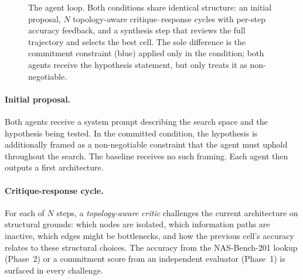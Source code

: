 \begin{figure}[ht]
\begin{center}
{}
\end{center}
\caption{The \haas{} agent loop. Both conditions share identical structure:
         an initial proposal, $N$ topology-aware critique--response cycles with
         per-step accuracy feedback, and a synthesis step that reviews the full
         trajectory and selects the best cell. The sole difference is the
         commitment constraint (blue) applied only in the \haas{} condition;
         both agents receive the hypothesis statement, but only \haas{} treats
         it as non-negotiable.}
\label{fig:loop}
\end{figure}

\paragraph{Initial proposal.} Both agents receive a system prompt describing
the search space and the hypothesis being tested. In the committed condition,
the hypothesis is additionally framed as a non-negotiable constraint that the
agent must uphold throughout the search. The baseline receives no such framing.
Each agent then outputs a first architecture.

\paragraph{Critique-response cycle.} For each of $N$ steps, a
\emph{topology-aware critic} challenges the current architecture on structural
grounds: which nodes are isolated, which information paths are inactive, which
edges might be bottlenecks, and how the previous cell's accuracy relates to these
structural choices. The accuracy from the NAS-Bench-201 lookup (Phase~2) or a
commitment score from an independent evaluator (Phase~1) is surfaced in every
challenge.

